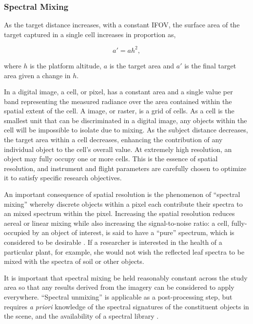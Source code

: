 
\subsubsection*{Spectral Mixing}

As the target distance increases, with a constant IFOV, the surface area of the target captured in a single cell increases in proportion as, 

\begin{equation}
a\prime = a h^2,
\end{equation}

where $h$ is the platform altitude, $a$ is the target area and $a\prime$ is the final target area given a change in $h$. 

In a digital image, a cell, or pixel, has a constant area and a single value per band representing the measured radiance over the area contained within the spatial extent of the cell. A image, or raster, is a grid of cells. As a cell is the smallest unit that can be discriminated in a digital image, any objects within the cell will be impossible to isolate due to mixing. As the subject distance decreases, the target area within a cell decreases, enhancing the contribution of any individual object to the cell's overall value. At extremely high resolution, an object may fully occupy one or more cells. This is the essence of spatial resolution, and instrument and flight parameters are carefully chosen to optimize it to satisfy specific research objectives. 

An important consequence of spatial resolution is the phenomenon of ``spectral mixing'' whereby discrete objects within a pixel each contribute their spectra to an mixed spectrum within the pixel. Increasing the spatial resolution reduces aereal or linear mixing \cite{Gupta2018} while also increasing the signal-to-noise ratio: a cell, fully-occupied by an object of interest, is said to have a ``pure'' spectrum, which is considered to be desirable \cite{Gupta2018}. If a researcher is interested in the health of a particular plant, for example, she would not wish the reflected leaf spectra to be mixed with the spectra of soil or other objects. 

It is important that spectral mixing be held reasonably constant across the study area so that any results derived from the imagery can be considered to apply everywhere. ``Spectral unmixing'' is applicable as a post-processing step, but requires \emph{a priori} knowledge of the spectral signatures of the constituent objects in the scene, and the availability of a spectral library \cite{Adams1986,Smith1990,Gupta2018}.




